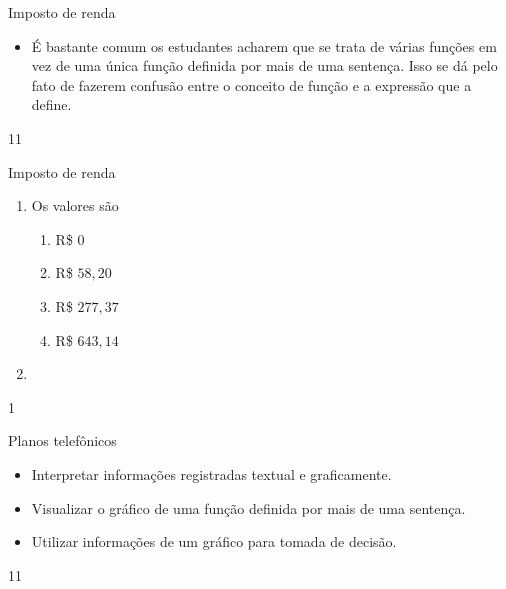 \begin{sugestions}{Imposto de renda}
{
\begin{itemize}
\item É bastante comum os estudantes acharem que se trata de várias funções em vez de uma única função definida por mais de uma sentença. Isso se dá pelo fato de fazerem confusão entre o conceito de função e a expressão que a define.
\end{itemize}
}{1}{1}
\end{sugestions}
\clearmargin
\begin{answer}{Imposto de renda}
{
\begin{enumerate}
\item Os valores são

\begin{enumerate}
\item R\$ $0$ 
\item R\$ $58{,}20$
\item R\$ $277{,}37$
\item R\$ $643{,}14$
\end{enumerate}

\item
{}

\end{enumerate}
}{1}
\end{answer}
\clearmargin
\begin{objectives}{Planos telefônicos}
{
\begin{itemize}

\item Interpretar informações registradas textual e graficamente.

\item Visualizar o gráfico de uma função definida por mais de uma sentença.

\item  Utilizar informações de um gráfico para tomada de decisão.

\end{itemize}
}{1}{1}
\end{objectives}
